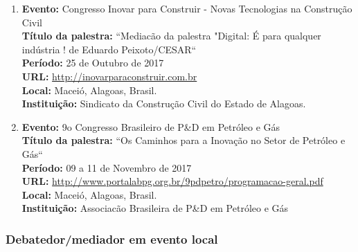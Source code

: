 \documentclass[a4paper,oneside,10pt]{article}
\begin{document}
\begin{enumerate}
\newpage 
\item   \textbf{Evento:} Congresso Inovar para Construir - Novas Tecnologias na Construção Civil
  \mbox{} \\
        \textbf{Título da palestra:} ``Mediacão da palestra "Digital: É para qualquer indústria ! de Eduardo Peixoto/CESAR``\\
        \textbf{Período:} 25 de Outubro de 2017\\
        \textbf{URL:} \url{http://inovarparaconstruir.com.br}\\
        \textbf{Local:} Maceió, Alagoas, Brasil.\\
         \textbf{Instituição:} Sindicato da Construção Civil do Estado de Alagoas.\\     
             
 \item   \textbf{Evento:} 9o Congresso Brasileiro de P\&D em Petróleo e Gás
  \mbox{} \\
        \textbf{Título da palestra:} ``Os Caminhos para a Inovação no Setor de Petróleo e Gás``\\
        \textbf{Período:} 09 a 11 de Novembro de 2017\\
        \textbf{URL:} \url{http://www.portalabpg.org.br/9pdpetro/programacao-geral.pdf}\\
        \textbf{Local:} Maceió, Alagoas, Brasil.\\
         \textbf{Instituição:} Associacão Brasileira de P\&D em Petróleo e Gás\\
          
\end{enumerate}


\subsubsection{Debatedor/mediador em evento local}
\vspace{0.3cm}
\end{document}
